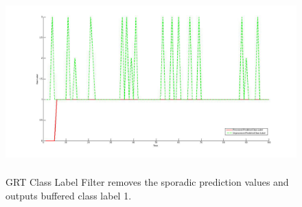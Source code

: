 \begin{figure}
	[h] \centering 
	\includegraphics[height=7cm]{figures/content/grt-label-filter.jpg} \caption{GRT Class Label Filter removes the sporadic prediction values and outputs buffered class label 1.  \cite{grt-spec}} \label{fg:grt:label} 
\end{figure}
